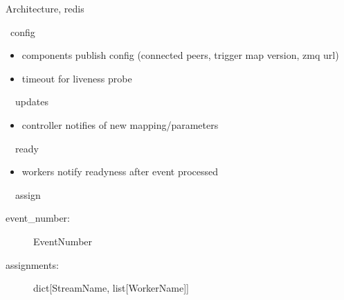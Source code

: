 \documentclass[aspectratio=169]{beamer}
\begin{document}
\begin{frame}{Architecture, redis}
 \begin{block}{\faDatabase\ config}
  \begin{itemize}
   \item components publish config (connected peers, trigger map version, zmq url)
   \item timeout for liveness probe
  \end{itemize}
 \end{block}

 \begin{block}{\faDatabase\ \faForward\ updates}
  \begin{itemize}
   \item controller notifies of new mapping/parameters
  \end{itemize}
 \end{block}

 \begin{block}{\faDatabase\ \faForward\ ready}
  \begin{itemize}
   \item workers notify readyness after event processed
  \end{itemize}
 \end{block}

 \begin{block}{\faDatabase\ \faForward\ assign}
  \begin{description}
   \item[event\_number:] EventNumber
   \item[assignments:] dict[StreamName, list[WorkerName]]
  \end{description}

 \end{block}

\end{frame}
\end{document}
